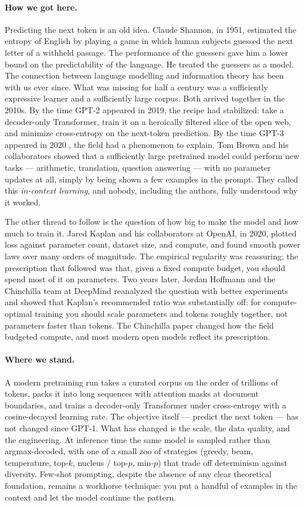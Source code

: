 \paragraph{How we got here.}
Predicting the next token is an old idea. Claude Shannon, in 1951,
estimated the entropy of English by playing a game in which human
subjects guessed the next letter of a withheld passage. The
performance of the guessers gave him a lower bound on the
predictability of the language. He treated the guessers as a model.
The connection between language modelling and information theory
has been with us ever since. What was missing for half a century
was a sufficiently expressive learner and a sufficiently large
corpus. Both arrived together in the 2010s. By the time GPT-2
appeared in 2019, the recipe had stabilized: take a decoder-only
Transformer, train it on a heroically filtered slice of the open
web, and minimize cross-entropy on the next-token prediction. By
the time GPT-3 appeared in 2020 \citep{brown2020language}, the
field had a phenomenon to explain. Tom Brown and his collaborators
showed that a sufficiently large pretrained model could perform
new tasks --- arithmetic, translation, question answering --- with
no parameter updates at all, simply by being shown a few examples
in the prompt. They called this \emph{in-context learning}, and
nobody, including the authors, fully understood why it worked.

The other thread to follow is the question of how big to make the
model and how much to train it. Jared Kaplan and his collaborators
at OpenAI, in 2020, plotted loss against parameter count, dataset
size, and compute, and found smooth power laws over many orders of
magnitude. The empirical regularity was reassuring; the prescription
that followed was that, given a fixed compute budget, you should
spend most of it on parameters. Two years later, Jordan Hoffmann
and the Chinchilla team at DeepMind reanalyzed the question with
better experiments and showed that Kaplan's recommended ratio was
substantially off: for compute-optimal training you should scale
parameters and tokens roughly together, not parameters faster than
tokens. The Chinchilla paper changed how the field budgeted
compute, and most modern open models reflect its prescription.

\paragraph{Where we stand.}
A modern pretraining run takes a curated corpus on the order of
trillions of tokens, packs it into long sequences with attention
masks at document boundaries, and trains a decoder-only Transformer
under cross-entropy with a cosine-decayed learning rate. The
objective itself --- predict the next token --- has not changed
since GPT-1. What has changed is the scale, the data quality, and
the engineering. At inference time the same model is sampled rather
than argmax-decoded, with one of a small zoo of strategies (greedy,
beam, temperature, top-$k$, nucleus / top-$p$, min-$p$) that trade
off determinism against diversity. Few-shot prompting, despite the
absence of any clear theoretical foundation, remains a workhorse
technique: you put a handful of examples in the context and let the
model continue the pattern.

